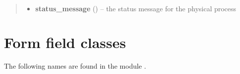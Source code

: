 \documentclass[a4paper,11pt,english]{sphinxmanual}
\begin{document}
\begin{fulllineitems}
\begin{fulllineitems}
\begin{quote}
\begin{description}
\begin{itemize}
\item {} 
\textbf{status\_message} () -- the status message for the physical process

\end{itemize}

\end{description}\end{quote}

\end{fulllineitems}


\end{fulllineitems}



\section{Form field classes}
\label{programming/utilities:form-field-classes}
The following names are found in the module .
\end{document}
